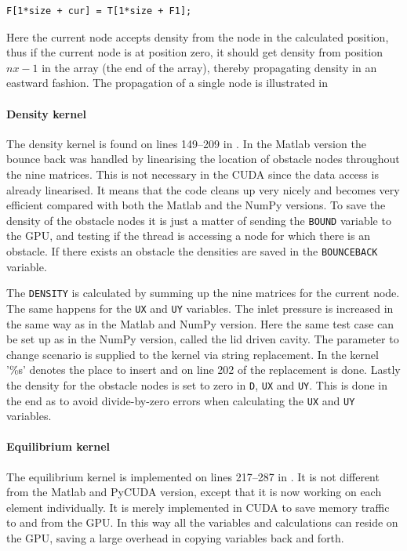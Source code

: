 \begin{verbatim}
F[1*size + cur] = T[1*size + F1];
\end{verbatim}

Here the current node accepts density from the node in the calculated position, thus if the current node is at position zero, it should get density from position $nx-1$ in the array (the end of the array), thereby propagating density in an eastward fashion. The propagation of a single node is illustrated in 


\paragraph{Density kernel}
The density kernel is found on lines 149--209 in . In the Matlab version the bounce back was handled by linearising the location of obstacle nodes throughout the nine matrices. This is not necessary in the CUDA since the data access is already linearised. It means that the code cleans up very nicely and becomes very efficient compared with both the Matlab and the NumPy versions. To save the density of the obstacle nodes it is just a matter of sending the \texttt{BOUND} variable to the GPU, and testing if the thread is accessing a node for which there is an obstacle. If there exists an obstacle the densities are saved in the \texttt{BOUNCEBACK} variable.

The \texttt{DENSITY} is calculated by summing up the nine matrices for the current node. The same happens for the \texttt{UX} and \texttt{UY} variables. The inlet pressure is increased in the same way as in the Matlab and NumPy version. Here the same test case can be set up as in the NumPy version, called the lid driven cavity. The parameter to change scenario is supplied to the kernel via string replacement. In the kernel '\%s' denotes the place to insert and on line 202 of  the replacement is done. Lastly the density for the obstacle nodes is set to zero in \texttt{D}, \texttt{UX} and \texttt{UY}. This is done in the end as to avoid divide-by-zero errors when calculating the \texttt{UX} and \texttt{UY} variables.


\paragraph{Equilibrium kernel}
The equilibrium kernel is implemented on lines 217--287 in . It is not different from the Matlab and PyCUDA version, except that it is now working on each element individually. It is merely implemented in CUDA to save memory traffic to and from the GPU. In this way all the variables and calculations can reside on the GPU, saving a large overhead in copying variables back and forth.

